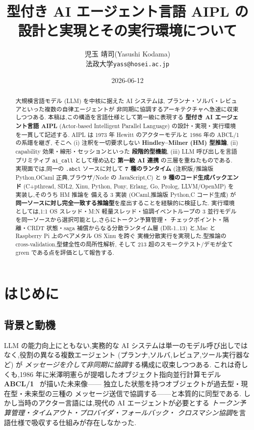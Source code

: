 \documentclass[11pt,a4paper]{article}
\title{\bfseries 型付き AI エージェント言語 AIPL の\\設計と実現とその実行環境について}
\author{児玉 靖司\quad (Yasushi Kodama)\\[2pt]
  {\small 法政大学\quad\texttt{yass@hosei.ac.jp}}}
\date{2026-06-12}
\newcommand{\code}[1]{\texttt{\small #1}}
\begin{document}
\maketitle

\begin{abstract}
大規模言語モデル (LLM) を中核に据えた AI システムは,
プランナ・ソルバ・レビュアといった複数の自律エージェントが
非同期に協調するアーキテクチャへ急速に収束しつつある.
本稿は,この構造を言語仕様として第一級に表現する
\textbf{型付き AI エージェント言語 AIPL} (Actor-based Intelligent
Parallel Language) の設計・実現・実行環境を一貫して記述する.
AIPL は 1973 年 Hewitt のアクターモデルと 1986 年の ABCL/1 の系譜を継ぎ,
そこへ (i) 注釈を一切要求しない \textbf{Hindley--Milner (HM) 型推論},
(ii) capability 効果・線形・セッションといった \textbf{段階的型機能},
(iii) LLM 呼び出しを言語プリミティブ \code{ai\_call} として埋め込む
\textbf{第一級 AI 連携} の三層を重ねたものである.
実現面では,同一の \code{.abcl} ソースに対して \textbf{7 種のランタイム}
(注釈版/推論版 Python,OCaml 正典,ブラウザ/Node の JavaScript,C) と
\textbf{9 種のコード生成バックエンド} (C+pthread, SDL2, Xinu, Python,
Pony, Erlang, Go, Prolog, LLVM/OpenMP) を実装し,そのうち HM 推論を
備える 3 実装 (OCaml,推論版 Python,C コード生成) が
\textbf{同一ソースに対し完全一致する推論型}を産出することを経験的に検証した.
実行環境としては,1:1 OS スレッド・M:N 軽量スレッド・協調イベントループの
3 並行モデルを同一ソースから選択可能とし,さらにトークン予算管理・
チェックポイント・隔離・CRDT 状態・saga 補償からなる分散ランタイム層
(DR-1..13) と,Mac と Raspberry Pi 上のベアメタル OS Xinu を跨ぐ
実機分散実行を実現した.型推論の cross-validation,型健全性の局所性解析,
そして 213 超のスモークテスト/デモが全て green である点を評価として報告する.
\end{abstract}

\tableofcontents
\vspace{1em}

\section{はじめに}

\subsection{背景と動機}

LLM の能力向上にともない,実務的な AI システムは単一のモデル呼び出しでは
なく,役割の異なる複数エージェント
(プランナ,ソルバ,レビュア,ツール実行器など) が
\emph{メッセージを介して非同期に協調}する構成に収束しつつある.
これは奇しくも,1986 年に米澤明憲らが提唱したオブジェクト指向並行計算モデル
\textbf{ABCL/1}~\cite{abcl1} が描いた未来像——
独立した状態を持つオブジェクトが過去型・現在型・未来型の三種の
メッセージ送信で協調する——と本質的に同型である.
しかし当時のアクター言語には,現代の AI エージェントが必要とする
\emph{トークン予算管理・タイムアウト・プロバイダ・フォールバック・
クロスマシン協調}を言語仕様で吸収する仕組みが存在しなかった.
\end{document}
